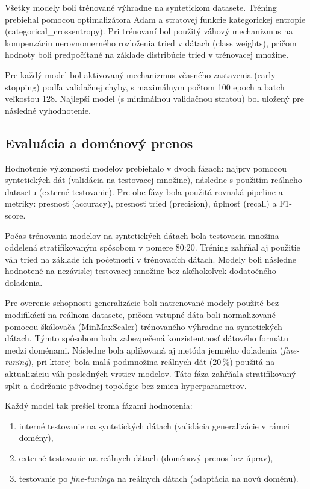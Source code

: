 \documentclass[a4paper,conference]{IEEEtran}
\begin{document}
Všetky modely boli trénované výhradne na syntetickom datasete. Tréning prebiehal pomocou optimalizátora Adam a stratovej funkcie kategorickej entropie (categorical\_crossentropy). Pri trénovaní bol použitý váhový mechanizmus na kompenzáciu nerovnomerného rozloženia tried v dátach (class weights), pričom hodnoty boli predpočítané na základe distribúcie tried v trénovacej množine.

Pre každý model bol aktivovaný mechanizmus včasného zastavenia (early stopping) podľa validačnej chyby, s maximálnym počtom 100 epoch a batch veľkosťou 128. Najlepší model (s minimálnou validačnou stratou) bol uložený pre následné vyhodnotenie.

\subsection{Evaluácia a doménový prenos}
\label{subsec3}

Hodnotenie výkonnosti modelov prebiehalo v dvoch fázach: najprv pomocou syntetických dát (validácia na testovacej množine), následne s použitím reálneho datasetu (externé testovanie). Pre obe fázy bola použitá rovnaká pipeline a metriky: presnosť (accuracy), presnosť tried (precision), úplnosť (recall) a F1-score.

Počas trénovania modelov na syntetických dátach bola testovacia množina oddelená stratifikovaným spôsobom v pomere 80:20. Tréning zahŕňal aj použitie váh tried na základe ich početnosti v trénovacích dátach. Modely boli následne hodnotené na nezávislej testovacej množine bez akéhokoľvek dodatočného doladenia.

Pre overenie schopnosti generalizácie boli natrenované modely použité bez modifikácií na reálnom datasete, pričom vstupné dáta boli normalizované pomocou škálovača (MinMaxScaler) trénovaného výhradne na syntetických dátach. Týmto spôsobom bola zabezpečená konzistentnosť dátového formátu medzi doménami. Následne bola aplikovaná aj metóda jemného doladenia (\textit{fine-tuning}), pri ktorej bola malá podmnožina reálnych dát (20\,\%) použitá na aktualizáciu váh posledných vrstiev modelov. Táto fáza zahŕňala stratifikovaný split a dodržanie pôvodnej topológie bez zmien hyperparametrov.

Každý model tak prešiel troma fázami hodnotenia:
\begin{enumerate}
    \item interné testovanie na syntetických dátach (validácia generalizácie v rámci domény),
    \item externé testovanie na reálnych dátach (doménový prenos bez úprav),
    \item testovanie po \textit{fine-tuningu} na reálnych dátach (adaptácia na novú doménu).
\end{enumerate}
\end{document}
